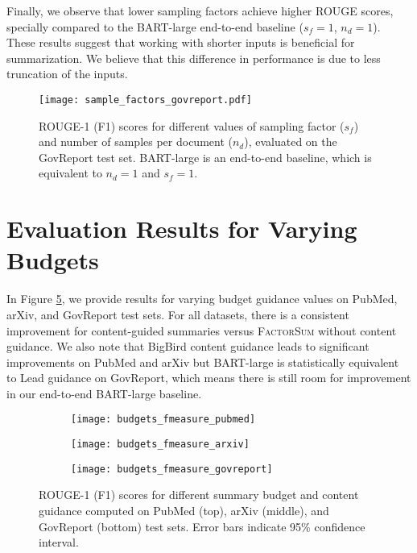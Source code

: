 \documentclass[11pt,table]{article}
\newcommand{\modelname}{FactorSum}
\begin{document}
Finally, we observe that lower sampling factors achieve higher ROUGE scores, specially compared to the BART-large end-to-end baseline ($s_f=1$, $n_d=1$). These results suggest that working with shorter inputs is beneficial for summarization. We believe that this difference in performance is due to less truncation of the inputs. 

\begin{figure}
    \centering
    \texttt{[image: sample\_factors\_govreport.pdf]}
    \caption{ROUGE-1 (F1) scores for different values of sampling factor ($s_f$) and number of samples per document ($n_d$), evaluated on the GovReport test set. BART-large is an end-to-end baseline, which is equivalent to $n_d=1$ and $s_f=1$.}\label{fig:sample_factors}
\end{figure}

\section{Evaluation Results for Varying Budgets}
In Figure \ref{fig:budgets_fmeasure}, we provide results for varying budget guidance values on PubMed, arXiv, and GovReport test sets. For all datasets, there is a consistent improvement for content-guided summaries versus \textsc{\modelname} without content guidance. We also note that BigBird content guidance leads to significant improvements on PubMed and arXiv but BART-large is statistically equivalent to Lead guidance on GovReport, which means there is still room for improvement in our end-to-end BART-large baseline. 

\label{sec:budgets_fmeasure}
\begin{figure}
    \centering
    \begin{subfigure}[b]{.49\textwidth}
         \centering
         \texttt{[image: budgets\_fmeasure\_pubmed]}
\label{fig:budgets_fmeasure_pubmed}
     \end{subfigure}
     \hfill
     \begin{subfigure}[b]{.49\textwidth}
         \centering
         \texttt{[image: budgets\_fmeasure\_arxiv]}
\label{fig:budgets_fmeasure_arxiv}
     \end{subfigure}
     \begin{subfigure}[b]{.49\textwidth}
         \centering
         \texttt{[image: budgets\_fmeasure\_govreport]}
         \label{fig:budgets_fmeasure_govreport}
     \end{subfigure}
    \vspace{-1.2\baselineskip}
    \caption{ROUGE-1 (F1) scores for different summary budget and content guidance computed on PubMed (top), arXiv (middle), and GovReport (bottom) test sets. Error bars indicate 95\% confidence interval.}
    \label{fig:budgets_fmeasure}
\end{figure}
\end{document}
